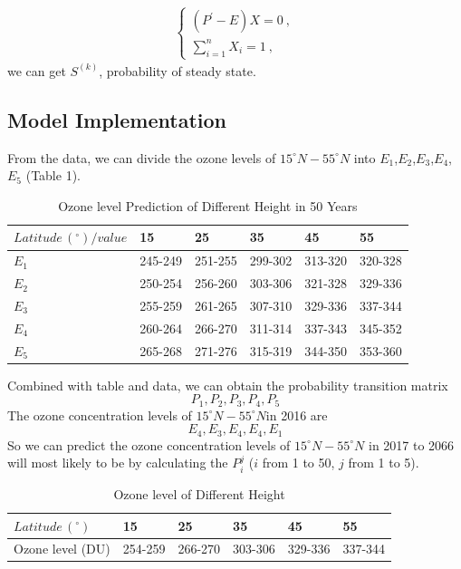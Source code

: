 \documentclass[12pt]{article}
\begin{document}
\begin{eqnarray}
\left\{
\begin{array}{ll}
(P^{'}-E)X=0 \  , \\
\sum_{i=1}^{n}X_{i}=1\ ,
\end{array}\right.\label{equ:dynamicofcollision}
\end{eqnarray}
we can get $S^{(k)}$, probability of steady state. 

\subsection{Model Implementation}
From the data, we can divide the ozone levels of $15^{\circ}N - 55^ {\circ}N$ into $E_1$,$E_2$,$E_3$,$E_4$,$E_5$ (Table 1).

\begin{center}
\begin{table}[H]
	\caption{Ozone level Prediction of Different Height in 50 Years}\label{tab:thi}
\begin{center}
\begin{tabular}{llllll}
\hline
    ${Latitude \, (^{\circ})} / {value}$ & 15 & 25 & 35 & 45 & 55 \\
\hline
$E_1$ & 245-249 & 251-255 & 299-302 & 313-320 & 320-328\\
$E_2$ & 250-254 & 256-260 & 303-306 & 321-328 & 329-336\\
$E_3$ & 255-259 & 261-265 & 307-310 & 329-336 & 337-344\\
$E_4$ & 260-264 & 266-270 & 311-314 & 337-343 & 345-352\\
$E_5$ & 265-268 & 271-276 & 315-319 & 344-350 & 353-360\\
\hline
\end{tabular}
\end{center}
\end{table}
\end{center}

Combined with table and data, we can obtain the probability transition matrix $$P_1, P_2, P_3, P_4, P_5$$ The ozone concentration levels of $15^{\circ}N - 55^ {\circ}N$in 2016 are $$E_4, E_3, E_4, E_4, E_1$$ So we can predict the ozone concentration levels of $15^{\circ}N - 55^ {\circ}N$ in 2017 to 2066 will most likely to be by calculating the $P_i^j$ ($i$ from 1 to 50, $j$ from 1 to 5).

\begin{center}
\begin{table}[H]
	\caption{Ozone level of Different Height}\label{tab:thi}
\begin{center}
\begin{tabular}{llllll}
\hline
    $Latitude \, (^{\circ})$ & 15 & 25 & 35 & 45 & 55 \\
\hline
Ozone level (DU) & 254-259 & 266-270 & 303-306 & 329-336 & 337-344\\
\hline
\end{tabular}
\end{center}
\end{table}
\end{center}
\end{document}
